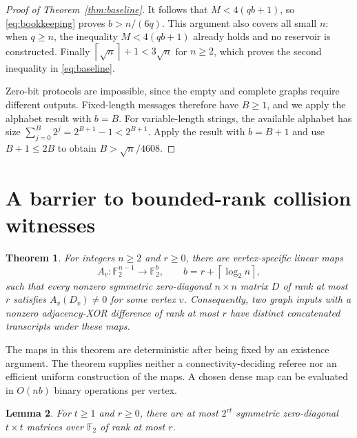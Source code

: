 \documentclass[11pt]{article}
\newtheorem{theorem}{Theorem}[section]
\newtheorem{lemma}[theorem]{Lemma}
\theoremstyle{remark}
\newcommand{\F}{\mathbb F_2}
\newcommand{\ceil}[1]{\left\lceil #1\right\rceil}
\begin{document}
\begin{proof}[Proof of Theorem~\ref{thm:baseline}]
It follows that $M<4(qb+1)$, so \eqref{eq:bookkeeping} proves
$b>n/(6q)$. This argument also covers all small $n$: when $q\ge n$,
the inequality $M<4(qb+1)$ already holds and no reservoir is constructed.
Finally $\ceil{\sqrt n}+1<3\sqrt n$ for $n\ge2$, which proves the
second inequality in \eqref{eq:baseline}.

Zero-bit protocols are impossible, since the empty and complete graphs
require different outputs. Fixed-length messages therefore have $B\ge1$,
and we apply the alphabet result with $b=B$. For variable-length strings,
the available alphabet has size
$\sum_{j=0}^B2^j=2^{B+1}-1<2^{B+1}$. Apply the result with $b=B+1$ and
use $B+1\le2B$ to obtain $B>\sqrt n/4608$.
\end{proof}

\section{A barrier to bounded-rank collision witnesses}

\begin{theorem}\label{thm:barrier}
For integers $n\ge2$ and $r\ge0$, there are vertex-specific linear maps
\[
 A_v:\F^{n-1}\longrightarrow\F^b,
 \qquad b=r+\ceil{\log_2 n},
\]
such that every nonzero symmetric zero-diagonal $n\times n$ matrix $D$
of rank at most $r$ satisfies $A_v(D_v)\ne0$ for some vertex $v$.
Consequently, two graph inputs with a nonzero adjacency-XOR difference
of rank at most $r$ have distinct concatenated transcripts under these maps.
\end{theorem}

The maps in this theorem are deterministic after being fixed by an
existence argument. The theorem supplies neither a connectivity-deciding
referee nor an efficient uniform construction of the maps. A chosen dense
map can be evaluated in $O(nb)$ binary operations per vertex.

\begin{lemma}\label{lem:alternating}
For $t\ge1$ and $r\ge0$, there are at most $2^{rt}$ symmetric
zero-diagonal $t\times t$ matrices over $\F$ of rank at most $r$.
\end{lemma}
\end{document}
